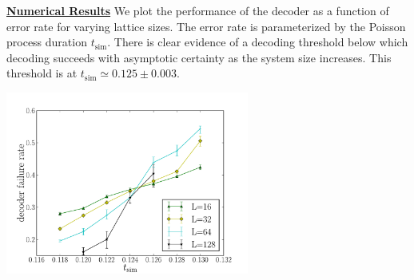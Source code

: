 \documentclass[12pt,notitlepage,aps,pra,longbibliography,nofootinbib,tightenlines,superscriptaddress]{revtex4}
\def\important #1{\underline{\bf #1}}
\begin{document}
\newpage

\important{Numerical Results}
We plot the performance of the decoder as a function
of error rate for varying lattice sizes.
The error rate is parameterized by the Poisson process duration $t_{\mathrm{sim}}$.
There is clear evidence of a decoding threshold below
which decoding succeeds with asymptotic certainty as the
system size increases.
This threshold is at $t_{\mathrm{sim}}\simeq 0.125 \pm 0.003.$

\begin{center}\includegraphics[width=0.6\textwidth]{anyons-kyle.pdf}\end{center}


{}

\end{document}
